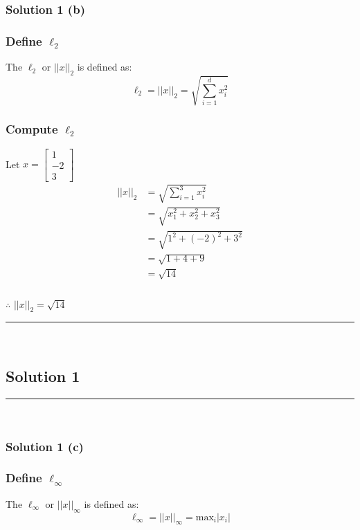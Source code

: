 \documentclass{article}
\begin{document}
\subsubsection*{Solution 1 (b)}
\subsubsection*{Define $\ell_2$}
\parbox{\textwidth}{
The $\ell_2$ or $||x||_2$ is defined as:
$$\ell_{2} = ||x||_2 = \sqrt{\sum_{i=1}^{d} x_{i}^2} $$
}
\subsubsection*{Compute $\ell_2$}
\parbox{\textwidth}{
Let $x=\begin{bmatrix} 1 \\ -2 \\ 3 \end{bmatrix}$ \\

\begin{align*}
  ||x||_2 &= \sqrt{\sum_{i=1}^{3} x_{i}^{2}} \\
  &= \sqrt{x_{1}^2 + x_{2}^{2} + x_{3}^{2}} \\
  &= \sqrt{1^{2} + (-2)^{2} + 3^{2}} \\
  &= \sqrt{1 + 4 + 9} \\
  &= \sqrt{14}
\end{align*}
}


\subsubsection*{\normalfont}{$\therefore$ $||x||_{2} = \sqrt{14}$}

\noindent\rule{\textwidth}{0.4pt}\\

\newpage

\subsection*{Solution 1}
\noindent\rule{\textwidth}{0.4pt}\\

\subsubsection*{Solution 1 (c)}
\subsubsection*{Define $\ell_{\infty}$}
\parbox{\textwidth}{
The $\ell_{\infty}$ or $||x||_{\infty}$ is defined as:
$$\ell_{\infty} = ||x||_{\infty} = \text{max}_{i}\left|x_{i}\right| $$
}
\end{document}
